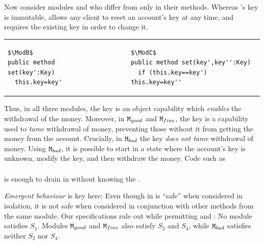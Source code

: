 \begin{example}
Now consider  modules \ModB and \ModC who differ from \ModA only in their  methods. Whereas \ModA 's key is immutable, \ModB allows any client to reset an account's key at any time, and \ModC requires the existing key in order to change it.
  

\begin{tabular}{lll}
\begin{minipage}[b]{0.40\textwidth}

\begin{lstlisting}[mathescape=true, language=Chainmail, frame=lines]
$\ModB$
public method set(key':Key)
  this.key=key'
\end{lstlisting}
\end{minipage}
&\ \ \  \ \   &%
\begin{minipage}[b]{0.48\textwidth}
\begin{lstlisting}[mathescape=true, language=chainmail, frame=lines]
$\ModC$
public method set(key',key'':Key)
  if (this.key==key')  this.key=key''
\end{lstlisting}
\end{minipage} 
\end{tabular}

{Thus, in all three modules, the key is an object capability which \emph{enables} the withdrawal of the money. 
Moreover, in $\mbox{\normalfont{\texttt{M}}}_{{good}}$ and $\mbox{\normalfont{\texttt{M}}}_{{fine}}$, the key
{is a capability} used to  \emph{tame} withdrawal of money, preventing those without it from getting the money from the account.}
Crucially,  in $\mbox{\normalfont{\texttt{M}}}_{{bad}}$ the key \emph{does not tame} withdrawal of money.
Using $\mbox{\normalfont{\texttt{M}}}_{{bad}}$, it is possible to start in a state where the account's key is unknown, modify the key, and then withdraw the money. 
Code  {such as}
\\ 
$\ \strut \hspace{.2in} $  
\\ 
is enough to drain   in \ModB without knowing the \password.
 
 \emph{Emergent behaviour} is key here: 
Even though %
 in  \ModB is ``safe'' when considered in isolation, it is not safe when considered in conjunction with other methods from the same module. 
Our  specifications  rule  out \ModB while permitting \ModA and
\ModC:
No module  satisfies $S_1$. Modules $\mbox{\normalfont{\texttt{M}}}_{{good}}$ and $\mbox{\normalfont{\texttt{M}}}_{{fine}}$ also satisfy $S_2$ and $S_4$, while $\mbox{\normalfont{\texttt{M}}}_{{bad}}$ satisfies neither $S_2$ nor $S_4$.
\end{example}
 
